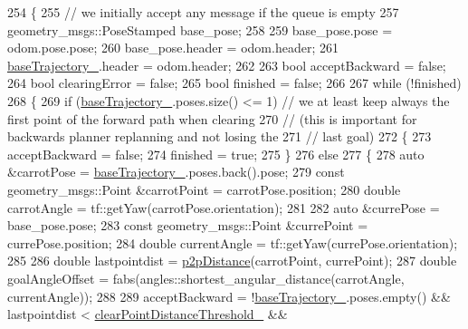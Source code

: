 \begin{DoxyCode}
254 \{
255   \textcolor{comment}{// we initially accept any message if the queue is empty}
257 \textcolor{comment}{}  geometry\_msgs::PoseStamped base\_pose;
258 
259   base\_pose.pose = odom.pose.pose;
260   base\_pose.header = odom.header;
261   \hyperlink{classcl__move__base__z_1_1odom__tracker_1_1OdomTracker_a466d18a86df049f0f680e043bb5ea91f}{baseTrajectory\_}.header = odom.header;
262 
263   \textcolor{keywordtype}{bool} acceptBackward = \textcolor{keyword}{false};
264   \textcolor{keywordtype}{bool} clearingError = \textcolor{keyword}{false};
265   \textcolor{keywordtype}{bool} finished = \textcolor{keyword}{false};
266 
267   \textcolor{keywordflow}{while} (!finished)
268   \{
269     \textcolor{keywordflow}{if} (\hyperlink{classcl__move__base__z_1_1odom__tracker_1_1OdomTracker_a466d18a86df049f0f680e043bb5ea91f}{baseTrajectory\_}.poses.size() <= 1)  \textcolor{comment}{// we at least keep always the first point of
       the forward path when clearing}
270                                             \textcolor{comment}{// (this is important for backwards planner replanning and not
       losing the}
271                                             \textcolor{comment}{// last goal)}
272     \{
273       acceptBackward = \textcolor{keyword}{false};
274       finished = \textcolor{keyword}{true};
275     \}
276     \textcolor{keywordflow}{else}
277     \{
278       \textcolor{keyword}{auto} &carrotPose = \hyperlink{classcl__move__base__z_1_1odom__tracker_1_1OdomTracker_a466d18a86df049f0f680e043bb5ea91f}{baseTrajectory\_}.poses.back().pose;
279       \textcolor{keyword}{const} geometry\_msgs::Point &carrotPoint = carrotPose.position;
280       \textcolor{keywordtype}{double} carrotAngle = tf::getYaw(carrotPose.orientation);
281 
282       \textcolor{keyword}{auto} &currePose = base\_pose.pose;
283       \textcolor{keyword}{const} geometry\_msgs::Point &currePoint = currePose.position;
284       \textcolor{keywordtype}{double} currentAngle = tf::getYaw(currePose.orientation);
285 
286       \textcolor{keywordtype}{double} lastpointdist = \hyperlink{namespacecl__move__base__z_1_1odom__tracker_a501582a760a02ce0069d95bfc67ca973}{p2pDistance}(carrotPoint, currePoint);
287       \textcolor{keywordtype}{double} goalAngleOffset = fabs(angles::shortest\_angular\_distance(carrotAngle, currentAngle));
288 
289       acceptBackward = !\hyperlink{classcl__move__base__z_1_1odom__tracker_1_1OdomTracker_a466d18a86df049f0f680e043bb5ea91f}{baseTrajectory\_}.poses.empty() && lastpointdist < 
      \hyperlink{classcl__move__base__z_1_1odom__tracker_1_1OdomTracker_a7155d25d0e8dd9f237a79ff503b80e26}{clearPointDistanceThreshold\_} &&

\end{DoxyCode}

